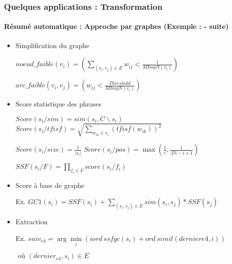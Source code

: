 \documentclass[xcolor=table]{beamer}
\begin{document}
\begin{frame}
	\frametitle{Quelques applications : Transformation}
	\framesubtitle{Résumé automatique : Approche par graphes (Exemple : \cite{21-aries-al} - suite)}
	
	\vspace{-6pt}
	\begin{itemize}
		\item Simplification du graphe
		
		\hspace{.5cm}$noeud\_faible(v_i) = ( \sum_{(v_i, v_j) \in E} w_{ij} < \frac{1}{MImpN(v_i)} )$ 
		
		\hspace{.5cm}$arc\_faible(v_i, v_j) = ( w_{ij} < \frac{Threshold}{MImpN(v_i)})$
		
		\item Score statistique des phrases
		
		\hspace{.5cm}$ Score(s_i/ sim) = sim(s_i, C\backslash s_i) $
		$Score(s_i/ tfisf) = \sqrt{\sum\limits_{w_{ik} \in s_i} (tfisf(w_{ik}))^2}$
		
		\hspace{.5cm}$Score(s_i/ size) = \frac{1}{|s_i|}$
		$Score(s_i/ pos) = \max (\frac{1}{i}, \frac{1}{|D| - i + 1})$
		
		\hspace{.5cm}$SSF(s_i/ F) = \prod_{f_i \in F} score(s_i/f_i)$
		
		\item Score à base de graphe 
		
		\hspace{.5cm}Ex. $GC1(s_i) = SSF(s_i) + \sum\limits_{(s_i, s_j) \in E} sim(s_i, s_j) * SSF(s_j)$
		
		\item Extraction
		
		\hspace{.5cm}Ex. $ suiv_{e4}  =  \arg\min\limits_i (iord\ ssfgc(s_i) + ord\ simil(dernier{e4}, i))$ 
		
		\hspace{3cm}$ \text{ où } (dernier_{e4}, s_i) \in E $
	\end{itemize}
	
\end{frame}
\end{document}
